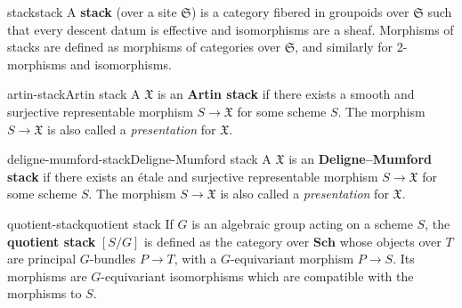 \begin{topic}{stack}{stack}
    A \textbf{stack} (over a site $\mathfrak{S}$) is a category fibered in groupoids over $\mathfrak{S}$ such that every descent datum is effective and isomorphisms are a sheaf. Morphisms of stacks are defined as morphisms of categories over $\mathfrak{S}$, and similarly for 2-morphisms and isomorphisms.
\end{topic}

\begin{topic}{artin-stack}{Artin stack}
    A  $\mathfrak{X}$ is an \textbf{Artin stack} if there exists a smooth and surjective representable morphism $S \to \mathfrak{X}$ for some scheme $S$. The morphism $S \to \mathfrak{X}$ is also called a \textit{presentation} for $\mathfrak{X}$.
\end{topic}

\begin{topic}{deligne-mumford-stack}{Deligne-Mumford stack}
    A  $\mathfrak{X}$ is an \textbf{Deligne--Mumford stack} if there exists an étale and surjective representable morphism $S \to \mathfrak{X}$ for some scheme $S$. The morphism $S \to \mathfrak{X}$ is also called a \textit{presentation} for $\mathfrak{X}$.
\end{topic}

\begin{topic}{quotient-stack}{quotient stack}
    If $G$ is an algebraic group acting on a scheme $S$, the \textbf{quotient stack} $[S/G]$ is defined as the category over $\textbf{Sch}$ whose objects over $T$ are principal $G$-bundles $P \to T$, with a $G$-equivariant morphism $P \to S$. Its morphisms are $G$-equivariant isomorphisms which are compatible with the morphisms to $S$.
\end{topic}
